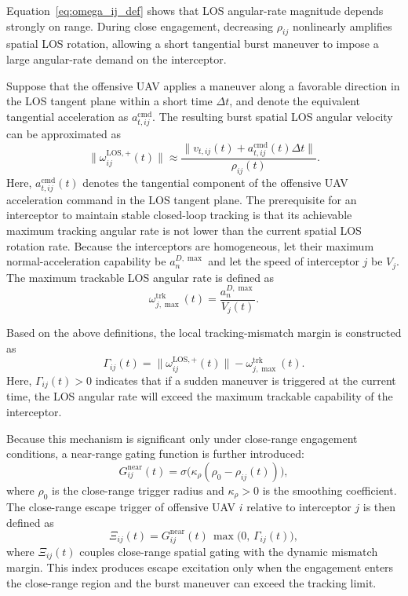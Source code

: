 \documentclass{cja}
\begin{document}
Equation~\eqref{eq:omega_ij_def} shows that LOS angular-rate magnitude depends strongly on range. During close engagement, decreasing $\rho_{ij}$ nonlinearly amplifies spatial LOS rotation, allowing a short tangential burst maneuver to impose a large angular-rate demand on the interceptor.

Suppose that the offensive UAV applies a maneuver along a favorable direction in the LOS tangent plane within a short time $\Delta t$, and denote the equivalent tangential acceleration as $a_{t,ij}^{\mathrm{cmd}}$. The resulting burst spatial LOS angular velocity can be approximated as
\begin{equation}
\|\omega_{ij}^{\mathrm{LOS},+}(t)\|
\approx
\frac{\|v_{t,ij}(t)+a_{t,ij}^{\mathrm{cmd}}(t)\Delta t\|}{\rho_{ij}(t)}.
\end{equation}
Here, $a_{t,ij}^{\mathrm{cmd}}(t)$ denotes the tangential component of the offensive UAV acceleration command in the LOS tangent plane.
The prerequisite for an interceptor to maintain stable closed-loop tracking is that its achievable maximum tracking angular rate is not lower than the current spatial LOS rotation rate. Because the interceptors are homogeneous, let their maximum normal-acceleration capability be $a_n^{D,\max}$ and let the speed of interceptor $j$ be $V_j$. The maximum trackable LOS angular rate is defined as
\begin{equation}
\omega_{j,\max}^{\mathrm{trk}}(t)
=
\frac{a_n^{D,\max}}{V_j(t)}.
\end{equation}

Based on the above definitions, the local tracking-mismatch margin is constructed as
\begin{equation}
\Gamma_{ij}(t)
=
\|\omega_{ij}^{\mathrm{LOS},+}(t)\|
-
\omega_{j,\max}^{\mathrm{trk}}(t).
\end{equation}
Here, $\Gamma_{ij}(t)>0$ indicates that if a sudden maneuver is triggered at the current time, the LOS angular rate will exceed the maximum trackable capability of the interceptor.

Because this mechanism is significant only under close-range engagement conditions, a near-range gating function is further introduced:
\begin{equation}
G_{ij}^{\mathrm{near}}(t)
=
\sigma\!\bigl(\kappa_{\rho}(\rho_0-\rho_{ij}(t))\bigr),
\end{equation}
where $\rho_0$ is the close-range trigger radius and $\kappa_{\rho}>0$ is the smoothing coefficient. The close-range escape trigger of offensive UAV $i$ relative to interceptor $j$ is then defined as
\begin{equation}
\Xi_{ij}(t)
=
G_{ij}^{\mathrm{near}}(t)\,\max\bigl(0,\, \Gamma_{ij}(t)\bigr),
\end{equation}
where $\Xi_{ij}(t)$ couples close-range spatial gating with the dynamic mismatch margin. This index produces escape excitation only when the engagement enters the close-range region and the burst maneuver can exceed the tracking limit.
\end{document}
